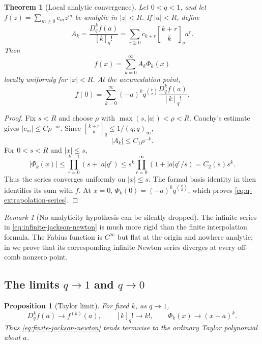 \documentclass[11pt,a4paper,oneside]{article}
\newtheorem{theorem}{Theorem}[section]
\newtheorem{proposition}[proposition]{Proposition}
\theoremstyle{definition}
\theoremstyle{remark}
\newtheorem{remark}[remark]{Remark}
\newcommand{\qbinom}[3]{\genfrac{[}{]}{0pt}{}{#1}{#2}_{#3}}
\begin{document}
\begin{theorem}[Local analytic convergence]
\label{thm:infinite-jackson-newton}
Let $0<q<1$, and let $f(z)=\sum_{m\ge0}c_mz^m$ be analytic in $|z|<R$.
If $|a|<R$, define
\begin{equation}
 A_k=\frac{D_q^kf(a)}{[k]_q!}
 =\sum_{r\ge0}c_{k+r}\qbinom{k+r}{k}q a^r.
 \label{eq:analytic-Ak}
\end{equation}
Then
\begin{equation}
 f(x)=\sum_{k=0}^\infty A_k\Phi_k(x)
 \label{eq:infinite-jackson-newton}
\end{equation}
locally uniformly for $|x|<R$.  At the accumulation point,
\begin{equation}
 f(0)=\sum_{k=0}^\infty
 (-a)^kq^{\binom k2}\frac{D_q^kf(a)}{[k]_q!}.
 \label{eq:q-extrapolation-series}
\end{equation}
\end{theorem}

\begin{proof}
Fix $s<R$ and choose $\rho$ with
$\max(s,|a|)<\rho<R$.  Cauchy's estimate gives
$|c_m|\le C\rho^{-m}$.  Since
$\qbinom{k+r}{k}q\le1/(q;q)_\infty$,
\[
 |A_k|\le C_1\rho^{-k}.
\]
For $0<s<R$ and $|x|\le s$,
\[
 |\Phi_k(x)|
 \le\prod_{r=0}^{k-1}(s+|a|q^r)
 \le s^k\prod_{r=0}^\infty(1+|a|q^r/s)=C_2(s)s^k.
\]
Thus the series converges uniformly on $|x|\le s$.  The formal basis identity
in  then identifies its sum with $f$.
At $x=0$, $\Phi_k(0)=(-a)^kq^{\binom k2}$, which proves
\eqref{eq:q-extrapolation-series}.
\end{proof}

\begin{remark}[No analyticity hypothesis can be silently dropped]
The infinite series in \eqref{eq:infinite-jackson-newton} is much more rigid
than the finite interpolation formula.  The Fabius function is $C^\infty$ but
flat at the origin and nowhere analytic; in  we prove that
its corresponding infinite Newton series diverges at every off-comb nonzero
point.
\end{remark}

\subsection{The limits \texorpdfstring{$q\to1$}{q to 1} and \texorpdfstring{$q\to0$}{q to 0}}

\begin{proposition}[Taylor limit]
\label{prop:taylor-limit}
For fixed $k$, as $q\to1$,
\[
 D_q^kf(a)\longrightarrow f^{(k)}(a),
 \qquad [k]_q!\longrightarrow k!,
 \qquad \Phi_k(x)\longrightarrow(x-a)^k.
\]
Thus \eqref{eq:finite-jackson-newton} tends termwise to the ordinary Taylor
polynomial about $a$.
\end{proposition}
\end{document}
